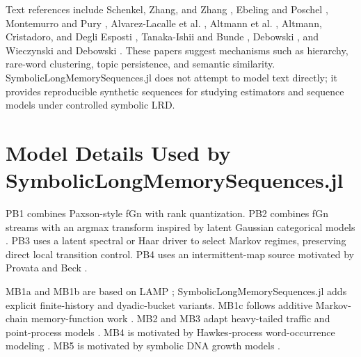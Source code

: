 \documentclass[11pt]{article}
\begin{document}
Text references include Schenkel, Zhang, and Zhang \cite{schenkel1993_long},
Ebeling and Poschel \cite{ebeling1994_entropy}, Montemurro and Pury
\cite{montemurro2002_long}, Alvarez-Lacalle et al.
\cite{alvarez2006_hierarchical}, Altmann et al. \cite{altmann2009_beyond},
Altmann, Cristadoro, and Degli Esposti \cite{altmann2012_on},
Tanaka-Ishii and Bunde \cite{tanaka2016_long}, Debowski
\cite{debowski2015_hilberg}, and Wieczynski and Debowski
\cite{wieczynski2025_long}. These papers suggest mechanisms such as hierarchy,
rare-word clustering, topic persistence, and semantic similarity. SymbolicLongMemorySequences.jl does
not attempt to model text directly; it provides reproducible synthetic
sequences for studying estimators and sequence models under controlled symbolic
LRD.

\section{Model Details Used by SymbolicLongMemorySequences.jl}

PB1 combines Paxson-style fGn \cite{paxson1997_fast} with rank quantization.
PB2 combines fGn streams with an argmax transform inspired by latent Gaussian
categorical models \cite{gal2015_latent}. PB3 uses a latent spectral or Haar
driver to select Markov regimes, preserving direct local transition control.
PB4 uses an intermittent-map source motivated by Provata and Beck
\cite{provata2012_coupled}.

MB1a and MB1b are based on LAMP \cite{kumar2017_linear}; SymbolicLongMemorySequences.jl adds explicit
finite-history and dyadic-bucket variants. MB1c follows additive Markov-chain
memory-function work \cite{melnyk2006_memory,mayzelis2006_additive,melnik2014_entropy}.
MB2 and MB3 adapt heavy-tailed traffic and point-process models
\cite{garrett1994_analysis,ryu1998_point,lowen1995_estimation}. MB4 is
motivated by Hawkes-process word-occurrence modeling \cite{ogura2022_modeling}.
MB5 is motivated by symbolic DNA growth models
\cite{koroteev2015_duplication,salgado2012_exact}.



\end{document}
